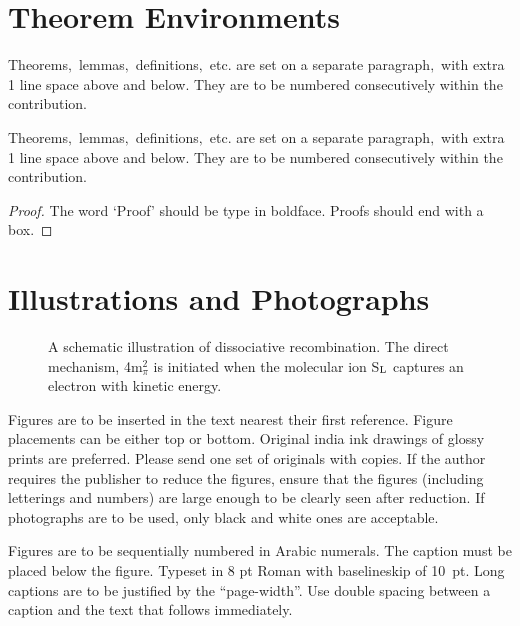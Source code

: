 \documentclass{ws-ijsc}
\begin{document}
\section{Theorem Environments}

\begin{theorem}
Theorems$,$ lemmas$,$ definitions$,$ etc. are set on a separate 
paragraph$,$ with extra 1 line space above and below. They are to 
be numbered consecutively within the contribution.
\end{theorem}

\begin{lemma}
Theorems$,$ lemmas$,$ definitions$,$ etc. are set on a separate 
paragraph$,$ with extra 1 line space above and below. They are to be 
numbered consecutively within the contribution.
\end{lemma}

\begin{proof}
The word `Proof' should be type in boldface. Proofs
should end with\break
a box. 
\end{proof}

\section{Illustrations and Photographs}

\begin{figure}[b]
\centerline{}
\vspace*{8pt}
\caption{A schematic illustration of dissociative recombination. The
direct mechanism, 4m$^2_\pi$ is initiated when the
molecular ion S$_{\rm L}$ captures an electron with kinetic energy.}
\end{figure}

Figures are to be inserted in the text nearest their first
reference.  Figure placements can be either top or bottom.
Original india ink drawings of glossy prints are
preferred. Please send one set of originals with copies. If the
author requires the publisher to reduce the figures, ensure that
the figures (including letterings and numbers) are large enough
to be clearly seen after reduction. If photographs are to be
used, only black and white ones are acceptable.

Figures are to be sequentially numbered in Arabic numerals. The
caption must be placed below the figure. Typeset in 8 pt Roman with
baselineskip of 10~pt. Long captions are to be justified by the
``page-width''.  Use double spacing between a caption and the text
that follows immediately.
\end{document}
